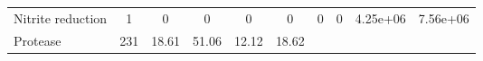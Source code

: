 \documentclass[]{article}
\begin{document}
\begin{longtable}[]{@{}lccccccccc@{}}
\begin{minipage}[t]{0.07\columnwidth}
Nitrite reduction\strut
\end{minipage} & \begin{minipage}[t]{0.06\columnwidth}\centering\strut
1\strut
\end{minipage} & \begin{minipage}[t]{0.08\columnwidth}\centering\strut
0\strut
\end{minipage} & \begin{minipage}[t]{0.08\columnwidth}\centering\strut
0\strut
\end{minipage} & \begin{minipage}[t]{0.08\columnwidth}\centering\strut
0\strut
\end{minipage} & \begin{minipage}[t]{0.08\columnwidth}\centering\strut
0\strut
\end{minipage} & \begin{minipage}[t]{0.08\columnwidth}\centering\strut
0\strut
\end{minipage} & \begin{minipage}[t]{0.08\columnwidth}\centering\strut
0\strut
\end{minipage} & \begin{minipage}[t]{0.08\columnwidth}\centering\strut
4.25e+06\strut
\end{minipage} & \begin{minipage}[t]{0.08\columnwidth}\centering\strut
7.56e+06\strut
\end{minipage}\tabularnewline
\begin{minipage}[t]{0.07\columnwidth}\raggedright\strut
Protease\strut
\end{minipage} & \begin{minipage}[t]{0.06\columnwidth}\centering\strut
231\strut
\end{minipage} & \begin{minipage}[t]{0.08\columnwidth}\centering\strut
18.61\strut
\end{minipage} & \begin{minipage}[t]{0.08\columnwidth}\centering\strut
51.06\strut
\end{minipage} & \begin{minipage}[t]{0.08\columnwidth}\centering\strut
12.12\strut
\end{minipage} & \begin{minipage}[t]{0.08\columnwidth}\centering\strut
18.62\strut
\end{minipage} & \begin{minipage}[t]{0.08\columnwidth}\centering\strut

\end{minipage}
\end{longtable}
\end{document}
